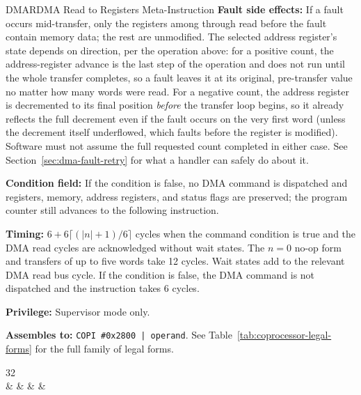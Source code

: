 \begin{instructionbox}{DMAR}{DMA Read to Registers Meta-Instruction}
	\textbf{Fault side effects:} If a fault occurs mid-transfer, only the registers among  through 
	read before the fault contain memory data; the rest are unmodified. The selected address register's state
	depends on direction, per the operation above: for a positive count, the address-register advance is the last
	step of the operation and does not run until the whole transfer completes, so a fault leaves it at its original,
	pre-transfer value no matter how many words were read. For a negative count, the address register is decremented
	to its final position \textit{before} the transfer loop begins, so it already reflects the full decrement even if
	the fault occurs on the very first word (unless the decrement itself underflowed, which faults before the register
	is modified). Software must not assume the full requested count completed in either
	case. See Section~\ref{sec:dma-fault-retry} for what a handler can safely do about it.

	\textbf{Condition field:} If the condition is false, no DMA command is dispatched and registers, memory, address
	registers, and status flags are preserved; the program counter still advances to the following instruction.

	\textbf{Timing:} $6 + 6\lceil (|n| + 1)/6 \rceil$ cycles when the command condition is true and the DMA read cycles are
	acknowledged without wait states. The $n = 0$ no-op form and transfers of up to five words take 12 cycles. Wait states add
	to the relevant DMA read bus cycle. If the condition is false, the DMA command is not dispatched and the instruction
	takes 6 cycles.

	\textbf{Privilege:} Supervisor mode only.

	\textbf{Assembles to:} \texttt{COPI \#0x2800 | operand}. See Table~\ref{tab:coprocessor-legal-forms} for the full family of legal forms.

	\begin{center}
		\begin{bytefield}[bitwidth=1.1em]{32}
			 \\
			 &
			 &
			 &
			 &
		\end{bytefield}
	\end{center}


\end{instructionbox}
